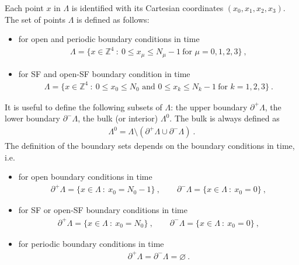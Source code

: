 \documentclass[11pt,fleqn]{article}
\begin{document}
Each point $x$ in $\Lambda$ is identified with its Cartesian coordinates $(x_0,x_1,x_2,x_3)$. The set of points $\Lambda$ is defined as follows:
\begin{itemize}[nolistsep,noitemsep]
   \item for open and periodic boundary conditions in time
   \begin{gather}
      \Lambda= \{ x \in \mathbb{Z}^4 \ : \ 0 \le x_\mu \le N_\mu-1 \ \text{for } \mu=0,1,2,3 \} \ ,
   \end{gather}
   \item for SF and open-SF boundary condition in time
   \begin{gather}
      \Lambda= \{ x \in \mathbb{Z}^4 \ : \ 0 \le x_0 \le N_0 \text{ and } 0 \le x_k \le N_k-1 \ \text{for } k=1,2,3 \} \ .
   \end{gather}
\end{itemize}
It is useful to define the following subsets of $\Lambda$: the upper boundary $\partial^+ \Lambda$, the lower boundary $\partial^- \Lambda$, the bulk (or interior) $\Lambda^0$. The bulk is always defined as
\begin{gather}
   \Lambda^0 = \Lambda \setminus ( \partial^+ \Lambda \cup \partial^- \Lambda) \ .
\end{gather}
The definition of the boundary sets depends on the boundary conditions in time, i.e.
\begin{itemize}[nolistsep,noitemsep]
   \item for open boundary conditions in time
   \begin{gather}
      \partial^+ \Lambda = \{ x \in \Lambda \ : \ x_0 = N_0-1 \} \ , \qquad
      \partial^- \Lambda = \{ x \in \Lambda \ : \ x_0 = 0 \} \ ,
   \end{gather}
   \item for SF or open-SF boundary conditions in time
   \begin{gather}
      \partial^+ \Lambda = \{ x \in \Lambda \ : \ x_0 = N_0 \} \ , \qquad
      \partial^- \Lambda = \{ x \in \Lambda \ : \ x_0 = 0 \} \ ,
   \end{gather}
   \item for periodic boundary conditions in time
   \begin{gather}
      \partial^+ \Lambda = \partial^- \Lambda = \varnothing \ .
   \end{gather}
\end{itemize}
\end{document}
